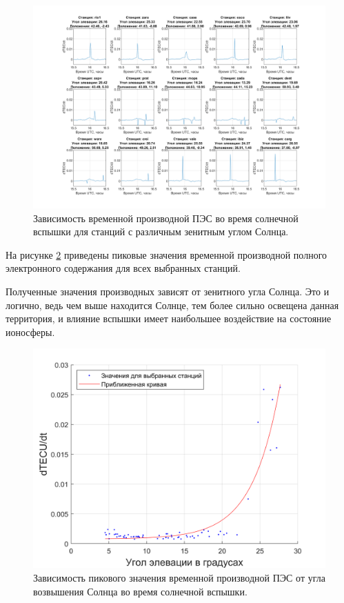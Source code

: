 \documentclass[a4paper]{article}
\begin{document}
\begin{landscape}
\begin{figure}[h!]
\centering
\includegraphics[width = 0.85\linewidth]{pics/clean_pics/dtec15.png}
\caption{Зависимость временной производной ПЭС во время солнечной вспышки для станций с различным зенитным углом Солнца.}
\label{dtec15}
\end{figure}
\end{landscape}

На рисунке \ref{dtecsun} приведены пиковые значения временной производной полного электронного содержания для всех выбранных станций.

Полученные значения производных зависят от зенитного угла Солнца. Это и логично, ведь чем выше находится Солнце, тем более сильно освещена данная территория, и влияние вспышки имеет наибольшее воздействие на состояние ионосферы.

\begin{figure}[h!]
\centering
\includegraphics[width = 1\linewidth]{pics/clean_pics/dtec_elev.png}
\caption{Зависимость пикового значения временной производной ПЭС от угла возвышения Солнца во время солнечной вспышки.}
\label{dtecsun}
\end{figure}
\end{document}
